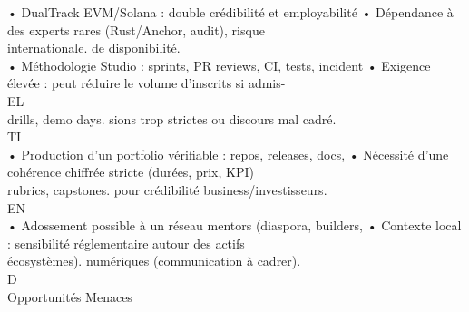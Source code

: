 • DualTrack EVM/Solana : double crédibilité et employabilité • Dépendance à des experts rares (Rust/Anchor, audit), risque\\
internationale.                                                  de disponibilité.\\
• Méthodologie Studio : sprints, PR reviews, CI, tests, incident • Exigence élevée : peut réduire le volume d’inscrits si admis-\\
\vspace{0.5em}
\vspace{0.5em}
\vspace{0.5em}
\vspace{0.5em}
EL\\
drills, demo days.                                               sions trop strictes ou discours mal cadré.\\
\vspace{0.5em}
\vspace{0.5em}
\vspace{0.5em}
\vspace{0.5em}
TI\\
• Production d’un portfolio vérifiable : repos, releases, docs,  • Nécessité d’une cohérence chiffrée stricte (durées, prix, KPI)\\
rubrics, capstones.                                              pour crédibilité business/investisseurs.\\
\vspace{0.5em}
\vspace{0.5em}
\vspace{0.5em}
\vspace{0.5em}
EN\\
• Adossement possible à un réseau mentors (diaspora, builders, • Contexte local : sensibilité réglementaire autour des actifs\\
écosystèmes).                                                    numériques (communication à cadrer).\\
\vspace{0.5em}
\vspace{0.5em}
\vspace{0.5em}
\vspace{0.5em}
D\\
Opportunités                                                          Menaces\\
\vspace{0.5em}
\vspace{0.5em}
\vspace{0.5em}
\vspace{0.5em}
